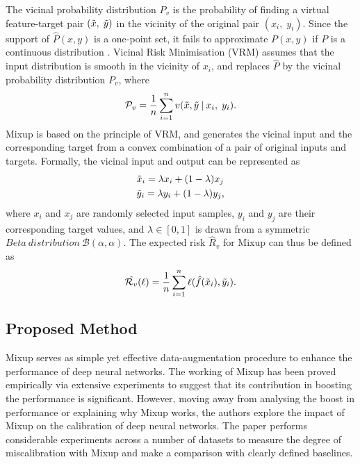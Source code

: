 The vicinal probability distribution ${P}_v$ is the probability of finding a virtual feature-target pair
$ (\Tilde{x},\; \Tilde{y})$ in the vicinity of the original pair $(x_i,\; y_i)$. Since the support of $\hat{P}(x,y)$ is a one-point set, it fails to approximate $P(x,y)$ if $P$ is a continuous distribution \cite{vrm_0, vrm_1}. Vicinal Risk Minimisation (VRM) \cite{vrm_0} assumes that the input distribution is smooth in the vicinity of $x_i$, and replaces $\hat{P}$ by the vicinal probability distribution ${P}_v$, where
\begin{equation}
    \mathcal{P}_v = \frac{1}{n} \sum_{i=1}^{n} v(\Tilde{x}, \Tilde{y}\: |\: x_i,\; y_i).
\end{equation}
Mixup \cite{mixup_2018} is based on the principle of VRM, and generates the vicinal input and the corresponding target from a convex combination of a pair of original inputs and targets. Formally, the vicinal input and output can be represented as
\begin{align}
    &\Tilde{x}_i = \lambda x_i + (1-\lambda)x_j \\
    &\Tilde{y}_i = \lambda y_i + (1-\lambda)y_j,
\end{align}
where $x_i$ and $x_j$ are randomly selected input samples, $y_i$ and $y_j$ are their corresponding target values, and $\lambda \in [0, 1] $ is drawn from a symmetric $Beta\: distribution \:\mathcal{B}(\alpha, \alpha)$. The expected risk $\hat{R}_v$ for Mixup can thus be defined as
\begin{equation}
\hat{\mathcal{R}_v}(\ell) = \frac{1}{n}\sum_{i=1}^{n} \ell(\hat{f}(\Tilde{x}_i), \Tilde{y}_i).
\label{eq:vrm}
\end{equation}

\subsection{Proposed Method}
Mixup serves as simple yet effective data-augmentation procedure to enhance the performance of deep neural networks. The working of Mixup has been proved empirically via extensive experiments to suggest that its contribution in boosting the performance is significant. However, moving away from analysing the boost in performance or explaining why Mixup works, the authors explore the impact of Mixup on the calibration of deep neural networks. The paper performs considerable experiments across a number of datasets to measure the degree of miscalibration with Mixup and make a comparison with clearly defined baselines.

